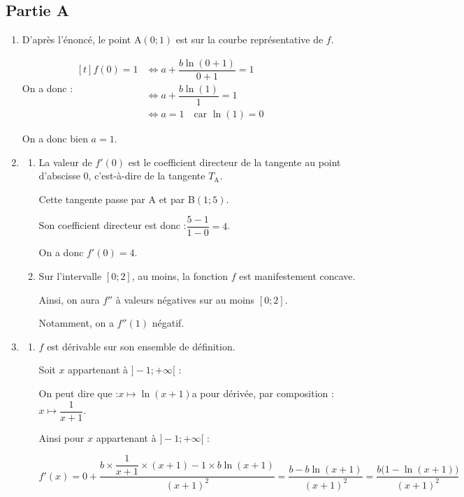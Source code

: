 \subsection*{Partie A}

	\begin{enumerate}
		\item D'après l'énoncé, le point A$(0 ; 1)$ est sur la courbe représentative de $f$.

		On a donc :\quad $\begin{aligned}[t]
			f(0) = 1
				&\iff a + \dfrac{b\ln(0 + 1)}{0 + 1} = 1\\
				&\iff a + \dfrac{b\ln(1)}{1}= 1\\
				&\iff a = 1 \quad \text{car } \ln(1) = 0
		\end{aligned}$

		On a donc bien $a=1$.

		\item \begin{enumerate}
			\item La valeur de $f'(0)$ est le coefficient directeur de la tangente au point d'abscisse 0, c'est-à-dire de la tangente $T_{\mathrm{A}}$.

			Cette tangente passe par A et par B$(1 ; 5)$.

			Son coefficient directeur est donc :\quad $\dfrac{5 - 1}{1 - 0} = 4$.

			On a donc $f'(0) = 4$.

			\item Sur l'intervalle $[0 ; 2]$, au moins, la fonction $f$ est manifestement concave.

			Ainsi, on aura $f''$ à valeurs négatives sur au moins $[0 ; 2]$.

			Notamment, on a $f''(1)$ négatif.
		\end{enumerate}

		\item \begin{enumerate}
			\item $f$ est dérivable sur son ensemble de définition.

			Soit $x$ appartenant à $]-1 ;+\infty[$ :

			On peut dire que :\quad $x \longmapsto \ln(x + 1)$\quad a pour dérivée, par composition : \quad $x \longmapsto \dfrac{1}{x+1}$.

			Ainsi pour $x$ appartenant à $]-1 ;+\infty[$ :

			$f'(x)=0 + \dfrac{b \times \dfrac{1}{x+1}\times (x+1) - 1 \times b\ln(x+1)}{(x+1)^2}
			=\dfrac{b - b\ln(x+1)}{(x+1)^2} =
			\dfrac{b\big(1-\ln (x+1)\big)}{(x+1)^{2}}$


\end{enumerate}
\end{enumerate}
